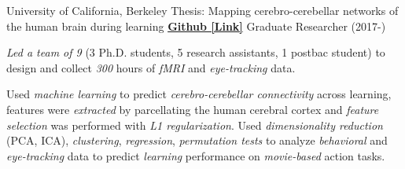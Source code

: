 

\begin{cventries}

  \cventry
    {University of California, Berkeley} %
    {Thesis: Mapping cerebro-cerebellar networks of the human brain during learning}
    {\href{https://github.com/maedbhk/cerebellum_learning_connect}{\textbf{Github [Link]}}}
    {Graduate Researcher (2017-)} %
    {
      \begin{cvitems} %
        \item {\textit{Led a team of 9} (3 Ph.D. students, 5 research assistants, 1 postbac student) to design and collect \textit{300} hours of \textit{fMRI} and \textit{eye-tracking} data.}
        \item {Used \textit{machine learning} to predict \textit{cerebro-cerebellar connectivity} across learning, features were \textit{extracted} by parcellating the human cerebral cortex and \textit{feature selection} was performed with \textit{L1 regularization}. Used \textit{dimensionality reduction} (PCA, ICA), \textit{clustering}, \textit{regression}, \textit{permutation tests}  to analyze \textit{behavioral} and \textit{eye-tracking} data to predict \textit{learning} performance on \textit{movie-based} action tasks.}
      \end{cvitems}
    }
    

\end{cventries}
